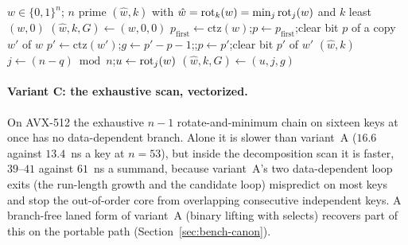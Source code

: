 \begin{algorithm}[t]
\caption{Zero-gap canonicalization, variant B, of an $n$-bit normal-basis word.}
\label{alg:zerogap}
\begin{algorithmic}[1]
\Require $w\in\{0,1\}^n$; $n$ prime
\Ensure $(\hat w,k)$ with $\hat w=\operatorname{rot}_k(w)=\min_j\operatorname{rot}_j(w)$ and $k$ least
 \Return $(w,0)$ 
\EndIf
\State $(\hat w,k,G)\gets(w,0,0)$ 
\State $p_{\mathrm{first}}\gets\mathrm{ctz}(w)$;\quad $p\gets p_{\mathrm{first}}$;\quad clear bit $p$ of a copy $w'$ of $w$
  \State $p'\gets\mathrm{ctz}(w')$;\quad $g\gets p'-p-1$;\quad {};\quad $p\gets p'$;\quad clear bit $p'$ of $w'$
\EndWhile
\State {} 
\State \Return $(\hat w,k)$
 
   \Return \EndIf
  \State $j\gets(n-q)\bmod n$;\quad $u\gets\operatorname{rot}_j(w)$ 
   $(\hat w,k,G)\gets(u,j,g)$ \EndIf
\EndProcedure
\end{algorithmic}
\end{algorithm}

\paragraph{Variant C: the exhaustive scan, vectorized.}
On AVX-512 the exhaustive $n-1$ rotate-and-minimum chain on sixteen
keys at once has no data-dependent branch. Alone it is slower than
variant~A ($16.6$ against $13.4$~ns a key at $n=53$), but inside the
decomposition scan it is faster, $39$--$41$ against $61$~ns a summand,
because variant~A's two data-dependent loop exits (the run-length
growth and the candidate loop) mispredict on most keys and stop the
out-of-order core from overlapping consecutive independent
keys.
A branch-free laned form of variant~A (binary lifting with selects)
recovers part of this on the portable path
(Section~\ref{sec:bench-canon}).

